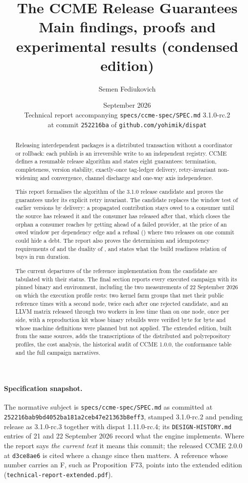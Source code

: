 \documentclass[11pt,a4paper]{article}
\title{The CCME Release Guarantees\\[2mm]
       \large Main findings, proofs and experimental results (condensed edition)}
\author{Semen Fediukovich}
\date{September 2026 \\[2mm]
      \normalsize Technical report accompanying \texttt{specs/ccme-spec/SPEC.md} 3.1.0-rc.2\\
      \normalsize at commit \texttt{252216ba} of \texttt{github.com/yohimik/dispat}}
\begin{document}
\maketitle

\begin{abstract}
Releasing interdependent packages is a distributed transaction without a
coordinator or rollback: each publish is an irreversible write to an
independent registry. CCME defines a resumable release algorithm and states
eight guarantees: termination, completeness, version stability, exactly-once
tag-ledger delivery, retry-invariant non-widening and convergence, channel
discharge and one-way axis independence.

This report formalises the algorithm of the 3.1.0 release candidate and proves
the guarantees under its explicit retry invariant. The candidate replaces the
window test of earlier versions by delivery: a propagated contribution stays
owed to a consumer until the source has released it and the consumer has
released after that, which closes the orphan a consumer reaches by getting
ahead of a failed provider, at the price of an owed window per dependency edge
and a refusal () where two releases on one commit could hide a debt.
The report also proves the determinism and idempotency requirements of
 and the duality of , and states what the build
readiness relation of  buys in run duration.

The current departures of the reference implementation from the candidate are
tabulated with their status. The final section reports every executed
campaign with its pinned binary and environment, including the two
measurements of 22 September 2026 on which the execution profile rests: two
kernel farm groups that met their public reference times with a second node,
twice each after one rejected candidate, and an LLVM matrix released through
two workers in less time than on one node, once per side, with a reproduction
kit whose binary rebuilds were verified byte for byte and whose machine
definitions were planned but not applied. The extended edition, built from
the same sources, adds the transcriptions of the distributed and
polyrepository profiles, the cost analysis, the historical audit of
CCME 1.0.0, the conformance table and the full campaign narratives.
\end{abstract}

\paragraph{Specification snapshot.}
The normative subject is \texttt{specs/ccme-spec/SPEC.md} as committed at
\texttt{252216bab9bd4052ba181a2ceb47e21363b8eff3}, stamped 3.1.0-rc.2 and
pending release as 3.1.0-rc.3 together with dispat 1.11.0-rc.4; its
\texttt{DESIGN-HISTORY.md} entries of 21 and 22 September 2026 record what the
engine implements. Where the report says \emph{the current text} it means this
commit; the released CCME 2.0.0 at \texttt{d3ce8ae6} is cited where a change
since then matters. A reference whose number carries an F, such as
Proposition~F73, points into the extended edition
(\texttt{technical-report-extended.pdf}).\par
\end{document}
